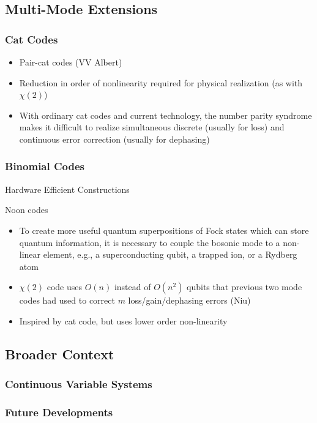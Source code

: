 \documentclass[12]{amsart}
\newcommand\0{\mathbf{0}}
\newcommand\<{\langle}
\renewcommand\>{\rangle}
\begin{document}
\subsection{Multi-Mode Extensions}

\subsubsection{Cat Codes}\label{sec:multi-cat}

\begin{itemize}
		\item Pair-cat codes (VV Albert)
		\item Reduction in order of nonlinearity required for physical realization (as with $\chi(2)$)
		\item With ordinary cat codes and current technology, the number parity syndrome makes it difficult to realize simultaneous discrete (usually for loss) and continuous error correction  (usually for dephasing)
	\end{itemize}
	
\subsubsection{Binomial Codes}

Hardware Efficient Constructions

Noon codes

\begin{itemize}
	\item To create more useful quantum superpositions of Fock states which can store quantum information, it is necessary to couple the bosonic mode to a non-linear element, e.g., a superconducting qubit, a trapped ion, or a Rydberg atom
		\item $\chi(2)$ code uses $O(n)$ instead of $O(n^2)$ qubits that previous two mode codes had used to correct $m$ loss/gain/dephasing errors (Niu)
		\item Inspired by cat code, but uses lower order non-linearity
	\end{itemize}

\subsection{Broader Context}

\subsubsection{Continuous Variable Systems}

\subsubsection{Future Developments}

\nocite{*}


\end{document}
